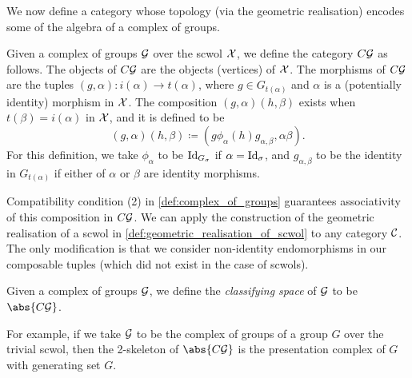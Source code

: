 We now define a category whose topology (via the geometric realisation) encodes some of the algebra of a complex of groups.
\begin{definition}
	Given a complex of groups $\mathcal{G}$ over the scwol  $\mathcal{X}$, we define the category $C\mathcal{G}$ as follows.
	The objects of  $C\mathcal{G}$ are the objects (vertices) of $\mathcal{X}$.
	The morphisms of $C\mathcal{G}$ are the tuples $(g,\alpha) \colon i(\alpha) \to t(\alpha)$, where  $g \in G_{t(\alpha)}$ and  $\alpha$ is a (potentially identity) morphism in $\mathcal{X}$.
	The composition  $(g,\alpha)(h,\beta)$ exists when  $t(\beta) = i(\alpha)$ in  $\mathcal{X}$, and it is defined to be
	\[
		(g,\alpha)(h,\beta) \coloneq (g\phi_\alpha(h)g_{\alpha,\beta}, \alpha\beta)
		.\]
	For this definition, we take $\phi_{\alpha}$ to be $\operatorname{Id}_{G_\sigma}$ if $\alpha = \operatorname{Id}_\sigma$, and $g_{\alpha,\beta}$ to be the identity in $G_{t(\alpha)}$ if either of $\alpha$ or  $\beta$ are identity morphisms.
\end{definition}
Compatibility condition (2) in \cref{def:complex_of_groups} guarantees associativity of this composition in  $C\mathcal{G}$.
We can apply the construction of the geometric realisation of a scwol in \cref{def:geometric_realisation_of_scwol} to any category $\mathcal{C}$.
The only modification is that we consider non-identity endomorphisms in our composable tuples (which did not exist in the case of scwols).

\begin{definition}
	Given a complex of groups $\mathcal{G}$, we define the \emph{classifying space} of  $\mathcal{G}$ to be  $\abs{C\calg}$.
\end{definition}
For example, if we take $\mathcal{G}$ to be the complex of groups of a group  $G$ over the trivial scwol, then the 2-skeleton of $\abs{C\calg}$  is the presentation complex of $G$ with generating set $G$.

